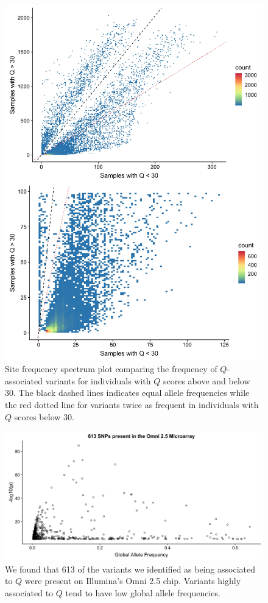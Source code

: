 \documentclass[9pt,lineno]{elife}
\begin{document}
\begin{figure}[h]
\centering
\includegraphics[width=15cm,keepaspectratio]{./Figures/OverUnder30.jpg}
\caption{Site frequency spectrum plot comparing the frequency of $Q$-associated variants for individuals with $Q$ scores above and below 30. The black dashed lines indicates equal allele frequencies while the red dotted line for variants twice as frequent in individuals with $Q$ scores below 30.}  
\label{90HanSFS_full}
\end{figure}

\begin{figure}[h]
\includegraphics[width=\hsize,keepaspectratio]{./Figures/Omni_AF.jpg}
\caption{We found that 613 of the variants we identified as being associated to $Q$ were present on Illumina's Omni 2.5 chip. Variants highly associated to $Q$ tend to have low global allele frequencies.}
\label{Omni}
\end{figure}
\end{document}
